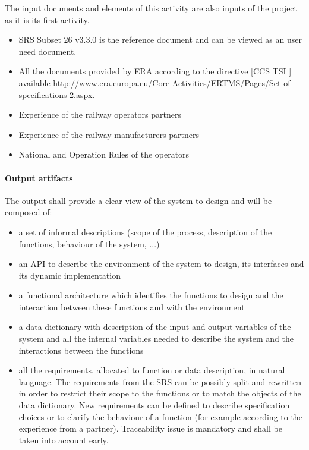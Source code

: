 The input documents and elements of this activity are also inputs of the project as it is its first activity.
\begin{itemize}
\item SRS Subset 26 v3.3.0 is the reference document and can be viewed as an user need document.
\item All the documents provided by ERA according to the directive [CCS TSI ] available \url{http://www.era.europa.eu/Core-Activities/ERTMS/Pages/Set-of-specifications-2.aspx}.
\item Experience of the railway operators partners
\item Experience of the railway manufacturers partners
\item National and Operation Rules of the operators
\end{itemize}

\paragraph{Output artifacts}

The output shall provide a clear view of the system to design and will be composed of:

\begin{itemize}
\item a set of informal descriptions (scope of the process, description of the functions, behaviour of the system, ...)
\item  an API to  describe the environment of the system to design, its interfaces and its dynamic implementation
\item a functional architecture which identifies the functions to design and the interaction between these functions and with the environment
\item a data dictionary with description of the input and output variables of the system and all the internal variables needed to  describe the system and the interactions between the functions
\item all the requirements, allocated to function or data description, in natural language. The requirements from the SRS can be possibly split and rewritten in order to restrict their scope to the functions or to match the objects of the data dictionary. New requirements can be defined to describe specification choices or to clarify the behaviour of a function (for example according to the experience from a partner). Traceability issue is mandatory and shall be taken into account early.

\end{itemize}

